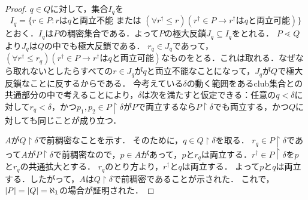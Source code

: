 \documentclass[uplatex]{jsarticle}
\newcommand{\restrict}{\upharpoonright}
\DeclarePairedDelimiter\abs{\lvert}{\rvert}
\renewcommand\subset{\subseteq}
\theoremstyle{definition}
\begin{document}
\begin{proof}
		$q \in Q$に対して，集合$I_q$を
		\[
		I_q = \{ r \in P : \text{$r$は$q$と両立不能 または } (\forall r^\dagger \le r)(r^\dagger \in P \rightarrow \text{$r^\dagger$は$q$と両立可能} )\}
		\]
		とおく．$I_q$は$P$の稠密集合である．よって$P$の極大反鎖$J_q \subset I_q$をとれる．
		$P \lessdot Q$より$J_q$は$Q$の中でも極大反鎖である．
		$r_q \in J_q$であって，$(\forall r^\dagger \le r_q)(r^\dagger \in P \rightarrow \text{$r^\dagger$は$q$と両立可能})$なものをとる．これは取れる．なぜなら取れないとしたらすべての$r \in J_q$が$q$と両立不能なことになって，$J_q$が$Q$で極大反鎖なことに反するからである．
		今考えている$\delta$の動く範囲をあるclub集合との共通部分の中で考えることにより，$\delta$は次を満たすと仮定できる：任意の$q < \delta$に対して$r_q < \delta$，かつ$p_1, p_2 \in P \restrict \delta$が$P$で両立するなら$P \restrict \delta$でも両立する，かつ$Q$に対しても同じことが成り立つ．
		
		$A$が$Q \restrict \delta$で前稠密なことを示す．
		そのために，$q \in Q \restrict \delta$を取る．
		$r_q \in P \restrict \delta$であって$A$が$P \restrict \delta$で前稠密なので，$p \in A$があって，$p$と$r_q$は両立する．$r^\dagger \in P \restrict \delta$を$p$と$r_q$の共通拡大とする．
		$r_q$のとり方より，$r^\dagger$と$q$は両立する．
		よって$p$と$q$は両立する．したがって，$A$は$Q \restrict \delta$で前稠密であることが示された．
		これで，$\abs{P} = \abs{Q} = \aleph_1$の場合が証明された．
	\end{proof}
	
	
	\nocite{*}
	\printbibliography[title={参考文献}]
	
\end{document}
